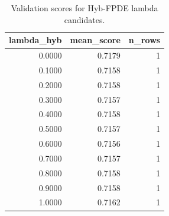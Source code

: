 \begin{table}[t]
\caption{Validation scores for Hyb-FPDE lambda candidates.}
\label{tab:lambda_distribution_computed}
\centering
\begin{tabular}{rrr}
\toprule
lambda\_hyb & mean\_score & n\_rows \\
\midrule
0.0000 & 0.7179 & 1 \\
0.1000 & 0.7158 & 1 \\
0.2000 & 0.7158 & 1 \\
0.3000 & 0.7157 & 1 \\
0.4000 & 0.7158 & 1 \\
0.5000 & 0.7157 & 1 \\
0.6000 & 0.7156 & 1 \\
0.7000 & 0.7157 & 1 \\
0.8000 & 0.7158 & 1 \\
0.9000 & 0.7158 & 1 \\
1.0000 & 0.7162 & 1 \\
\bottomrule
\end{tabular}

\end{table}
